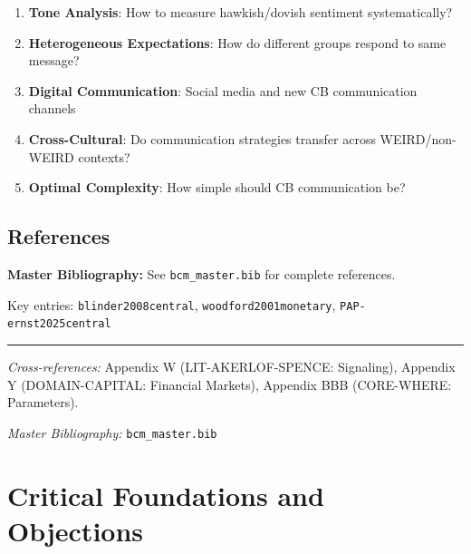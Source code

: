 \begin{enumerate}
  \item \textbf{Tone Analysis}: How to measure hawkish/dovish sentiment systematically?
  \item \textbf{Heterogeneous Expectations}: How do different groups respond to same message?
  \item \textbf{Digital Communication}: Social media and new CB communication channels
  \item \textbf{Cross-Cultural}: Do communication strategies transfer across WEIRD/non-WEIRD contexts?
  \item \textbf{Optimal Complexity}: How simple should CB communication be?
\end{enumerate}

\subsection{References}

\begin{tcolorbox}[colback=blue!5!white, colframe=blue!75!black]
\textbf{Master Bibliography:} See \texttt{bcm\_master.bib} for complete references.

Key entries: \texttt{blinder2008central}, \texttt{woodford2001monetary}, \texttt{PAP-ernst2025central}
\end{tcolorbox}

\vspace{1em}
\hrule
\vspace{0.5em}

\noindent\textit{Cross-references:}
Appendix W (LIT-AKERLOF-SPENCE: Signaling),
Appendix Y (DOMAIN-CAPITAL: Financial Markets),
Appendix BBB (CORE-WHERE: Parameters).

\noindent\textit{Master Bibliography:} \texttt{bcm\_master.bib}



\section{Critical Foundations and Objections}
\label{sec:bl-foundations}

